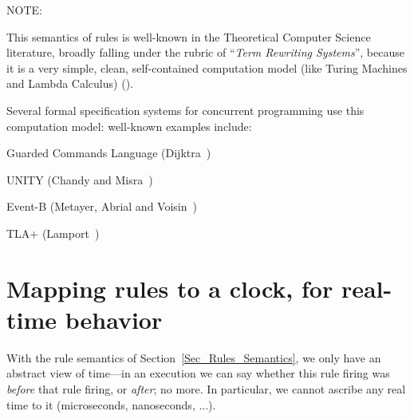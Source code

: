 \vspace{2ex}

NOTE: 

\vspace{2ex}

This semantics of rules is well-known in the Theoretical Computer
Science literature, broadly falling under the rubric of ``\emph{Term
Rewriting Systems}'', because it is a very simple, clean,
self-contained computation model (like Turing Machines and Lambda
Calculus) (\cite{Baader98a,Kamperman1996a,Klop1992a,Terese2003}).

Several formal specification systems for concurrent programming use
this computation model: well-known examples include:
\begin{tightlist}
 \item Guarded Commands Language (Dijktra~\cite{Dijkstra1976})
 \item UNITY (Chandy and Misra~\cite{Chandy1988a})
 \item Event-B (Metayer, Abrial and Voisin~\cite{Metayer2005a})
 \item TLA+ (Lamport~\cite{Lamport2002a})
\end{tightlist}


\section{Mapping rules to a clock, for real-time behavior}

\label{Sec_Mapping_Rules_to_a_Clock}

With the rule semantics of Section~\ref{Sec_Rules_Semantics}, we only
have an abstract view of time---in an execution we can say whether
this rule firing was \emph{before} that rule firing, or \emph{after};
no more. In particular, we cannot ascribe any real time to it
(microseconds, nanoseconds, ...).

